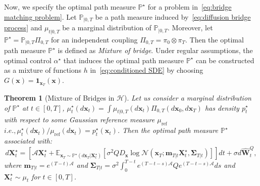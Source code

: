 \documentclass[nohyperref]{article}
\theoremstyle{plain}
\newtheorem{theorem}{Theorem}[section]
\theoremstyle{remark}
\newcommand{\mc}{\mathcal}
\newcommand{\mb}{\mathbf}
\newcommand{\ie}{\textit{i}.\textit{e}., }
\begin{document}
Now, we specify the optimal path measure $\mathbb{P}^{\star}$ for a problem in~\eqref{eq:bridge matching problem}.
Let $\mathbb{P}_{|0, T}$ be a path measure induced by~\eqref{eq:diffusion bridge process} and $\mu_{t|0, T}$ be a marginal distribution of $\mathbb{P}_{|0, T}$. Moreover, let $\mathbb{P}^{\star} = \mathbb{P}_{|0, T} \Pi_{0, T}$ for an independent coupling $\Pi_{0, T} = \pi_0 \otimes \pi_T$. Then the optimal path measure $\mathbb{P}^{\star}$ is defined as \textit{Mixture of bridge}. 
Under regular assumptions, the optimal control $\alpha^{\star}$ that induces the optimal path measure $\mathbb{P}^{\star}$ can be constructed as a mixture of functions $h$ in~\eqref{eq:conditioned SDE} by choosing $G(\mb{x}) = \mb{1}_{\mb{x}_T}(\mb{x})$.
\begin{theorem}[Mixture of Bridges in $\mc{H}$]\label{theorem:mixture of bridge} Let us consider a marginal distribution of $\mathbb{P}^{\star}$ at $t \in [0, T]$, $\mu^{\star}_t(d\mb{x}_t) = \int \mu_{t|0, T}(d\mb{x}_t) \Pi_{0, T}(d\mb{x}_0, d\mb{x}_T)$ has density $p^{\star}_t$ with respect to some Gaussian reference measure $\mu_{\text{ref}}$ $\ie \mu^{\star}_t(d\mb{x}_t)/\mu_{\text{ref}}(d\mb{x}_t) = p^{\star}_t(\mb{x}_t)$. Then the optimal path measure $\mathbb{P}^{\star}$ associated with:
\begin{equation}\label{eq:target SDE}
    d\mb{X}^{\star}_t = \left[\mc{A}\mb{X}^{\star}_t + \mathbb{E}_{\mb{x}_T \sim \mathbb{P}^{\star}(d\mb{x}_T|\mb{X}^{\star}_t)}\left[ \sigma^2 Q D_{\mb{x}} \log \mc{N}(\mb{x}_T; \mb{m}_{T|t} \mb{X}^{\star}_t, \mb{\Sigma}_{T|t}) \right]\right]dt + \sigma d\mb{\hat{W}}^Q_t,
\end{equation}
where $\mb{m}_{T|t} = e^{(T-t)\mc{A}}$ and $\mb{\Sigma}_{T|t} = \sigma^2 \int_0^{T-t} e^{(T-t-s) \mc{A}} Q e^{(T-t-s) \mc{A}} ds$ and $\mb{X}^{\star}_t \sim \mu_t$ for $t \in [0, T]$.
\end{theorem}
\end{document}
